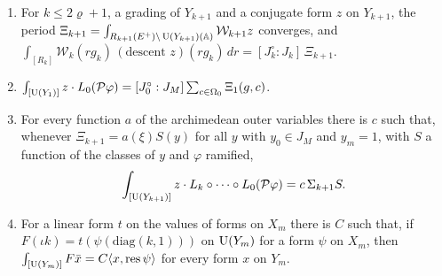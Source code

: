 \begin{proposition}\label{prop:outer-integrals}
\begin{enumerate}[label=\textup{(\alph*)}]
\item For $k\le2\varrho+1$, a grading of $Y_{k+1}$ and a conjugate form $z$ on $Y_{k+1}$, the period
$\Xi_{k+1}=\int_{R_{k+1}(E^+)\backslash\operatorname{U}(Y_{k+1})(\mathbb{A})}\mathcal W_{k+1}z$ converges, and
$\int_{[R_k]}\mathcal W_k(rg_k)\,(\text{descent }z)(rg_k)\,dr=[J^\circ_k:J_k]\,\Xi_{k+1}$.
\item $\int_{[\operatorname{U}(Y_1)]}z\cdot L_0(\mathcal P\varphi)=[J^\circ_0:J_M]\sum_{c\in\Omega_0}\Xi_1(g,c)$.
\item For every function $a$ of the archimedean outer variables there is $c$ such that, whenever $\Xi_{k+1}=a(\xi)S(y)$ for all $y$ with
$y_0\in J_M$ and $y_m=1$, with $S$ a function of the classes of $y$ and $\varphi$ ramified,
\[
  \int_{[\operatorname{U}(Y_{k+1})]}z\cdot L_k\circ\dots\circ L_0(\mathcal P\varphi)=c\,\Sigma_{k+1}S .
\]
\item For a linear form $t$ on the values of forms on $X_m$ there is $C$ such that, if $F(\iota k)=t(\psi(\mathrm{diag}(k,1)))$ on $\operatorname{U}(Y_m)$ for a form
$\psi$ on $X_m$, then $\int_{[\operatorname{U}(Y_m)]}F\bar x=C\langle x,\mathrm{res}\,\psi\rangle$ for every form $x$ on $Y_m$.
\end{enumerate}
\end{proposition}

